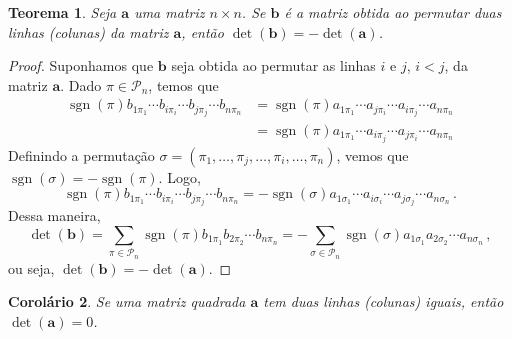 \documentclass[12pt,a4paper]{report}
\newcommand{\mb}{\mathbf}
\newcommand{\mc}{\mathcal}
\newtheorem{thm}{Teorema}[chapter]
\newtheorem{cor}[thm]{Corolário}
\DeclareMathOperator{\sgn}{sgn}
\begin{document}
\begin{thm}
  \label{det.anti}
  Seja $\mb a$ uma matriz $n\times n$. Se $\mb b$ é a matriz obtida ao permutar duas linhas (colunas) da matriz $\mb a$, então $\det(\mb b)=-\det(\mb a)$.
\end{thm}
\begin{proof}
  Suponhamos que $\mb b$ seja obtida ao permutar as linhas $i$ e $j$, $i<j$, da matriz $\mb a$. Dado $\pi\in\mc P_n$, temos que
  \begin{equation*}
    \begin{split}
      \sgn(\pi)b_{1\pi_1}\cdots b_{i\pi_i}\cdots b_{j\pi_j}\cdots b_{n\pi_n}&=\sgn(\pi)a_{1\pi_1}\cdots a_{j\pi_i}\cdots a_{i\pi_j}\cdots a_{n\pi_n}\\
      &=\sgn(\pi)a_{1\pi_1}\cdots a_{i\pi_j}\cdots a_{j\pi_i}\cdots a_{n\pi_n}
    \end{split}
  \end{equation*}
  Definindo a permutação $\sigma=(\pi_1,\ldots,\pi_j,\ldots,\pi_i,\ldots,\pi_n)$, vemos que $\sgn(\sigma)=-\sgn(\pi)$. Logo,
  $$\sgn(\pi)b_{1\pi_1}\cdots b_{i\pi_i}\cdots b_{j\pi_j}\cdots b_{n\pi_n}=-\sgn(\sigma)a_{1\sigma_1}\cdots a_{i\sigma_i}\cdots a_{j\sigma_j}\cdots a_{n\sigma_n}\,.$$
  Dessa maneira,
  $$\det(\mb b)=\sum_{\pi\in\mc P_n}\sgn(\pi)b_{1\pi_1}b_{2\pi_2}\cdots b_{n\pi_n}=-\sum_{\sigma\in\mc P_n}\sgn(\sigma)a_{1\sigma_1}a_{2\sigma_2}\cdots a_{n\sigma_n}\,,$$
  ou seja, $\det(\mb b)=-\det(\mb a)$.
\end{proof}
\begin{cor}
  Se uma matriz quadrada $\mb a$ tem duas linhas (colunas) iguais, então $\det(\mb a)=0$.
\end{cor}
\end{document}
